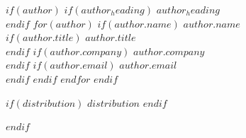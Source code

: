 \documentclass[
    $if(fontsize)$$fontsize$$else$10pt$endif$,
    $if(papersize)$$papersize$paper$else$letterpaper$endif$,
    titlepage,
    oneside,
    openright,
    $if(is_draft)$draft$else$final$endif$,
    article]{memoir}
\begin{document}
\begin{flushright}
        \vspace*{1.75in}
        $if(author)$
            $if(author_heading)$
                {\fontsize{12pt}{14pt}\textrm{$author_heading$}}\\[1em]
            $endif$
            $for(author)$
                $if(author.name)$
                    \vspace*{1.4em}
                    {\fontsize{12pt}{14pt}\textbf{$author.name$}}\\[0.2em]
                    $if(author.title)$
                        {\fontsize{11pt}{13pt}\textrm{$author.title$}}\\[0.2em]
                    $endif$
                    $if(author.company)$
                        {\fontsize{11pt}{13pt}\textrm{$author.company$}}\\[0.2em]
                    $endif$
                    $if(author.email)$
                        {\fontsize{11pt}{13pt}\textrm{$author.email$}}\\
                    $endif$
                $endif$
            $endfor$
        $endif$

        \vspace{\fill}
        $if(distribution)$
            {\fontsize{10pt}{13pt}\textrm{$distribution$}}
        $endif$
    \end{flushright}
$endif$



\frontmatter
\end{document}
